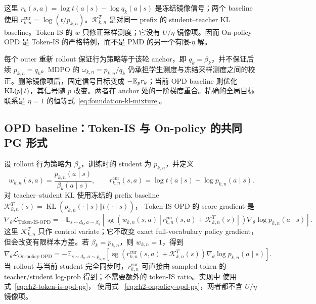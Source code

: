 这里 $r_k(s,a)=\log t(a\mid s)-\log q_k(a\mid s)$ 是冻结镜像信号；两个 baseline 使用 $r_{k,n}^{\mathrm{cur}}=\log(t/p_{k,n})$。$\mathcal K_{k,n}^{T}$ 是对同一 prefix 的 student--teacher KL baseline。Token-IS
的 $w$ 只修正采样测度；它没有 $U/\eta$ 镜像项。因而 On-policy OPD 是 Token-IS
的严格特例，而不是 PMD 的另一个有限-$\eta$ 解。

每个 outer 重新 rollout 保证行为策略等于该轮 anchor，即 $q_k=\beta_k$，并不保证后续 $p_{k,n}=q_k$。MDPO 的 $\omega_{k,n}=p_{k,n}/q_k$ 仍承担学生测度与冻结采样测度之间的校正。删除镜像项后，固定信号目标变成 $-\mathbb E_p r_k$；当前 OPD baseline 则优化 $\operatorname{KL}(p\Vert t)$，其信号随 $p$ 改变。两者在 anchor 处的一阶梯度重合。精确的全局目标联系是 $\eta=1$ 的恒等式~\eqref{eq:foundation-kl-mixture}。

\subsection{OPD baseline：Token-IS 与 On-policy 的共同 PG 形式}
\label{subsec:ch2-opd-baselines-in-map}

设 rollout 行为策略为 $\beta_k$，训练时的 student 为 $ p_{k,n}$，并定义
\begin{equation}
\label{eq:ch2-opd-is-pg}
w_{k,n}(s,a)=\frac{ p_{k,n}(a\mid s)}{\beta_k(a\mid s)},
\qquad
r_{k,n}^{\mathrm{cur}}(s,a)=\log t(a\mid s)-\log p_{k,n}(a\mid s).
\end{equation}
对 teacher--student KL 使用冻结的 prefix baseline
$\mathcal K_{k,n}^{T}(s)=\operatorname{KL}( p_{k,n}(\cdot\mid s)\Vert t(\cdot\mid s))$，
Token-IS OPD 的 score gradient 是
\begin{equation}
\label{eq:ch2-token-is-opd-pg}
\nabla_\theta\mathcal L_{\mathrm{Token\text{-}IS\text{-}OPD}}
=-\mathbb E_{s\sim d_k,a\sim\beta_k}
\left[\operatorname{sg}\!\left(w_{k,n}(s,a)[r_{k,n}^{\mathrm{cur}}(s,a)+\mathcal K_{k,n}^{T}(s)]\right)
\nabla_\theta\log p_{k,n}(a\mid s)\right].
\end{equation}
这里 $\mathcal K_{k,n}^{T}$ 只作 control variate；它不改变 exact full-vocabulary policy gradient，
但会改变有限样本方差。若 $\beta_k= p_{k,n}$，则 $w_{k,n}=1$，得到
\begin{equation}
\label{eq:ch2-onpolicy-opd-pg}
\nabla_\theta\mathcal L_{\mathrm{On\text{-}policy\text{-}OPD}}
=-\mathbb E_{s\sim d_k,a\sim p_{k,n}}
\left[\operatorname{sg}\!\left(r_{k,n}^{\mathrm{cur}}(s,a)+\mathcal K_{k,n}^{T}(s)\right)
\nabla_\theta\log p_{k,n}(a\mid s)\right].
\end{equation}
当 rollout 与当前 student 完全同步时，$r_{k,n}^{\mathrm{cur}}$ 可直接由 sampled token 的
teacher/student log-prob 得到；不需要额外的 token-IS ratio。实现中
 使用式~\eqref{eq:ch2-token-is-opd-pg}， 使用式
~\eqref{eq:ch2-onpolicy-opd-pg}，两者都不含 $U/\eta$ 镜像项。

